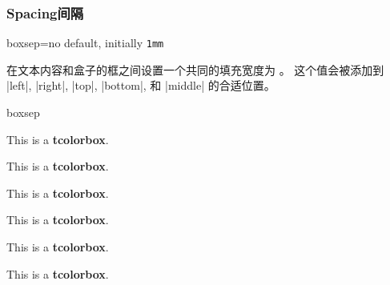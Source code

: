 \subsubsection{Spacing\hfill 间隔}
\begin{docTcbKey}{boxsep}{=}{no default, initially \texttt{1mm}}

在文本内容和盒子的框之间设置一个共同的填充宽度为 。 这个值会被添加到
  |left|, |right|, |top|, |bottom|, 和 |middle| 的合适位置。
\begin{exdispExample}{boxsep}

\begin{tcolorbox}
This is a \textbf{tcolorbox}.
\end{tcolorbox}
\begin{tcolorbox}[draft]
This is a \textbf{tcolorbox}.
\end{tcolorbox}

\begin{tcolorbox}[boxsep=0mm]
This is a \textbf{tcolorbox}.
\end{tcolorbox}
\begin{tcolorbox}[boxsep=0mm,draft]
This is a \textbf{tcolorbox}.
\end{tcolorbox}

\begin{tcolorbox}[boxsep=5mm]
This is a \textbf{tcolorbox}.
\end{tcolorbox}
\begin{tcolorbox}[boxsep=5mm,draft]
This is a \textbf{tcolorbox}.
\end{tcolorbox}
\end{exdispExample}
\end{docTcbKey}


